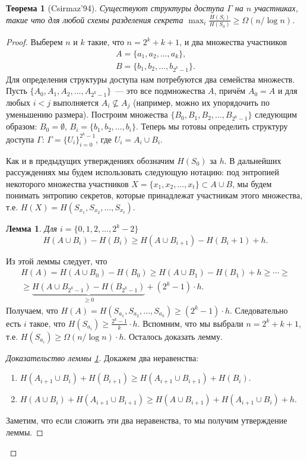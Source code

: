 \documentclass[12pt]{article}
\newcommand{\seqn}[2]{{#1}_1,{#1}_2,\dotsc,{#1}_{#2}}
\newcommand{\seqin}[3]{{#1}_{{#2}_1},{#1}_{{#2}_2},\dotsc,{#1}_{{#2}_{#3}}}
\theoremstyle{definition}
\theoremstyle{plain}
\newtheorem{theorem}{Теорема}[section]
\newtheorem{lemma}{Лемма}[section]
\theoremstyle{remark}
\begin{document}
\begin{theorem}[Csirmaz'94]
    Существуют структуры доступа $\Gamma$ на $n$ участниках, такие что для любой схемы разделения
    секрета $\max_i\frac{H(S_i)}{H(S_0)} \ge \Omega(n/\log n)$.
\end{theorem}
\begin{proof}
    Выберем $n$ и $k$ такие, что $n = 2^k + k + 1$, и два множества участников 
    \[
        \begin{array}{l}
            A = \{\seqn{a}{k}\},\\
            B = \{\seqn{b}{2^k - 1}\}.
        \end{array}
    \]
    Для определения структуры доступа нам потребуются два семейства множеств. 
    Пусть $\{A_0,\seqn{A}{2^k-1}\}$~--- это все подмножества $A$, причём $A_0 = A$ и для любых
    $i < j$ выполняется $A_i\not\subseteq A_j$ (например, можно их упорядочить по уменьшению
    размера). Построим множества $\{B_0,\seqn{B}{2^k - 1}\}$ следующим образом: $B_0 = \emptyset$, 
    $B_i = \{\seqn{b}{i}\}$.  
    Теперь мы готовы определить структуру доступа $\Gamma$: $\Gamma = \{U_i\}_{i=0}^{2^k-1}$, где $U_i =
    A_i\cup B_i$. 
    
    Как и в предыдущих утверждениях обозначим $H(S_0)$ за $h$.
    В дальнейших рассуждениях мы будем использовать следующую нотацию: под энтропией некоторого
    множества участников $X = \{\seqn{x}{t}\}\subset A\cup B$, мы будем понимать энтропию секретов, которые
    принадлежат участникам этого множества, т.е. $H(X) = H(\seqin{S}{x}{t})$.

    \begin{lemma}\label{lm:secretlb} Для $i=\{0,1,2,\dots,2^k-2\}$
        \[
            H(A\cup B_i) - H(B_i) \ge H(A\cup B_{i+1}) - H(B_i+1) + h.
        \]
    \end{lemma}
    Из этой леммы следует, что 
    \begin{multline*}
        H(A) = H(A\cup B_0) - H(B_0) \ge H(A\cup B_{1}) - H(B_1) + h \ge \dotsb \ge\\
        \ge \underbrace{H(A\cup B_{2^k-1}) - H(B_{2^k-1})}_{\ge 0} + (2^k - 1)\cdot h.
    \end{multline*}
    Получаем, что $H(A) = H(\seqin{S}{a}{k})\ge (2^k - 1) \cdot h$. Следовательно есть $i$ такое,
    что $H(S_{a_i})\ge \frac{2^k - 1}{k}\cdot h$.
    Вспомним, что мы выбрали $n = 2^k + k + 1$, т.е. $H(S_{a_i})\ge \Omega(n/\log n) \cdot h$.
    Осталось доказать лемму.
    \begin{proof}[Доказательство леммы \ref{lm:secretlb}]
        Докажем два неравенства:
        \begin{enumerate}
            \item $H(A_{i+1}\cup B_i) + H(B_{i+1}) \ge  H(A_{i+1} \cup B_{i+1}) + H(B_i) $.
            \item $H(A\cup B_i) + H(A_{i+1}\cup B_{i+1}) \ge H(A\cup B_{i+1}) + H(A_{i+1}\cup B_i) + h$.
        \end{enumerate}
        Заметим, что если сложить эти два неравенства, то мы получим утверждение леммы.
    

\end{proof}
\end{proof}
\end{document}
